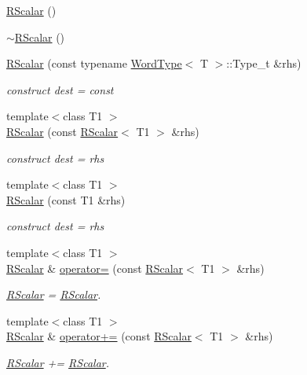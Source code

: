 \begin{DoxyCompactItemize}
\mbox{\hyperlink{classENSEM_1_1RScalar_aef2d18c787b469c86b94f18e711cd556}{R\+Scalar}} ()
\item 
\mbox{\hyperlink{classENSEM_1_1RScalar_a6508c0b6ff5db38e53a19f0d376dde49}{$\sim$\+R\+Scalar}} ()
\item 
\mbox{\hyperlink{classENSEM_1_1RScalar_a49babd15684b91b796da264d2aa2681f}{R\+Scalar}} (const typename \mbox{\hyperlink{structENSEM_1_1WordType}{Word\+Type}}$<$ T $>$\+::Type\+\_\+t \&rhs)
\begin{DoxyCompactList}\small\item\em construct dest = const \end{DoxyCompactList}\item 
{\footnotesize template$<$class T1 $>$ }\\\mbox{\hyperlink{classENSEM_1_1RScalar_a93e56021a00d35af008ae72de2eb60f2}{R\+Scalar}} (const \mbox{\hyperlink{classENSEM_1_1RScalar}{R\+Scalar}}$<$ T1 $>$ \&rhs)
\begin{DoxyCompactList}\small\item\em construct dest = rhs \end{DoxyCompactList}\item 
{\footnotesize template$<$class T1 $>$ }\\\mbox{\hyperlink{classENSEM_1_1RScalar_aef7513413ed5dbf6bb8bc37b73b88d00}{R\+Scalar}} (const T1 \&rhs)
\begin{DoxyCompactList}\small\item\em construct dest = rhs \end{DoxyCompactList}\item 
{\footnotesize template$<$class T1 $>$ }\\\mbox{\hyperlink{classENSEM_1_1RScalar}{R\+Scalar}} \& \mbox{\hyperlink{classENSEM_1_1RScalar_a81b105339878a490866e9467135ae4fa}{operator=}} (const \mbox{\hyperlink{classENSEM_1_1RScalar}{R\+Scalar}}$<$ T1 $>$ \&rhs)
\begin{DoxyCompactList}\small\item\em \mbox{\hyperlink{classENSEM_1_1RScalar}{R\+Scalar}} = \mbox{\hyperlink{classENSEM_1_1RScalar}{R\+Scalar}}. \end{DoxyCompactList}\item 
{\footnotesize template$<$class T1 $>$ }\\\mbox{\hyperlink{classENSEM_1_1RScalar}{R\+Scalar}} \& \mbox{\hyperlink{classENSEM_1_1RScalar_adc6bf2610b8af0ab175ef00d9194aa1d}{operator+=}} (const \mbox{\hyperlink{classENSEM_1_1RScalar}{R\+Scalar}}$<$ T1 $>$ \&rhs)
\begin{DoxyCompactList}\small\item\em \mbox{\hyperlink{classENSEM_1_1RScalar}{R\+Scalar}} += \mbox{\hyperlink{classENSEM_1_1RScalar}{R\+Scalar}}. \end{DoxyCompactList}\item 

\end{DoxyCompactItemize}
